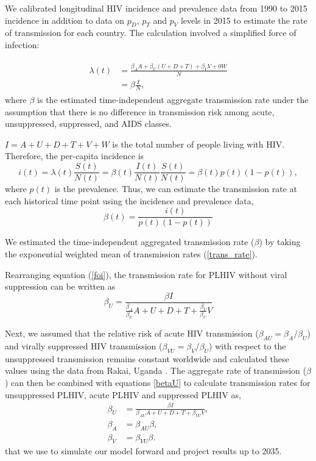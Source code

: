 \documentclass[11pt]{article}
\begin{document}
{We calibrated longitudinal HIV incidence and prevalence data from
  1990 to 2015 incidence in addition to data on $p_{D}$, $p_{T}$ and
  $p_{V}$ levels in 2015 to estimate the rate of transmission for each
  country. The calculation involved a simplified force of infection:}

\begin{align}
  \label{foi}
  \begin{split}
  \lambda(t) &  =    \frac{\beta_{A} A + \beta_{U}(U+D+T)+\beta_{V}V+0
               W}{N} \\
             &  =  \beta \frac{I}{N},
             \end{split}
\end{align}
where $\beta$ is the estimated time-independent aggregate transmission rate under the
assumption that there is no difference in transmission risk among acute, unsuppressed, suppressed, and AIDS classes.

$I = A+U+D+T+V+W$ is the total number of people living with HIV. Therefore, the per-capita
incidence is
\begin{equation}
i(t) = \lambda(t) \frac{S(t)}{N(t)}
= \beta(t) \frac{I(t)}{N(t)} \frac{S(t)}{N(t)} =\beta(t) p(t) (1-p(t)),
\end{equation}
where $p(t)$ is the prevalence. Thus, we can estimate the
transmission rate at each historical time point using the incidence
and prevalence data,
\begin{equation}
  \label{trans_rate}
  \beta(t) = \frac{i(t)}{p(t)(1-p(t))}
\end{equation}


We estimated the time-independent aggregated transmission rate ($\beta$)
by taking the exponential weighted mean of transmission rates
(\ref{trans_rate}).


Rearranging equation (\ref{foi}), the transmission rate for PLHIV
without viral suppression can be written as
\begin{equation}
\label{betaU}
  \beta_{U} = \frac{\beta I}{\frac{\beta_{A}}{\beta_{U}}A +
    U+D+T+\frac{\beta_{V}}{\beta_{U}}V}
\end{equation}


Next, we assumed that the relative risk of acute HIV transmission
($\beta_{AU} = \beta_{A}/\beta_{U}$) and virally suppressed HIV
transmission ($\beta_{VU} = \beta_{V}/\beta_{U}$) with respect to the
unsuppressed transmission remains constant worldwide and calculated
these values using the data from Rakai, Uganda \cite{Wawer2005-us}. The aggregate
rate of transmission ($\beta$) can then be combined with equations \ref{betaU} to calculate transmission
rates for unsuppressed PLHIV, acute PLHIV and suppressed PLHIV as,
\begin{align}
  \beta_{U} & = \frac{\beta I}{\beta_{AU}A +
              U+D+T+\beta_{VU}V}, \\
  \beta_{A} & = \beta_{AU}\beta, \\
  \beta_{V} & = \beta_{VU} \beta.
\end{align}
that we use to simulate our model forward and project results up to 2035.
\\
\end{document}
